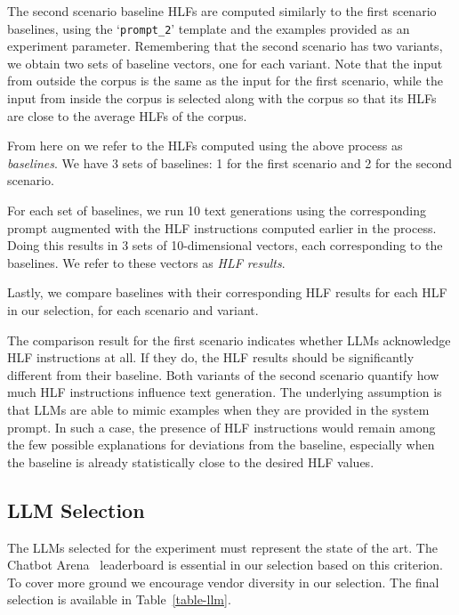 \documentclass[a4paper,twoside]{article}
\begin{document}
The second scenario baseline HLFs are computed similarly to the first scenario
baselines, using the `\texttt{prompt\_2}' template and the examples provided as
an experiment parameter.
Remembering that the second scenario has two variants, we obtain two sets of
baseline vectors, one for each variant.
Note that the input from outside the corpus is the same as the input for the
first scenario, while the input from inside the corpus is selected along with
the corpus so that its HLFs are close to the average HLFs of the corpus.

From here on we refer to the HLFs computed using the above process as
\textit{baselines}.
We have 3 sets of baselines: 1 for the first scenario and 2 for the second
scenario.

For each set of baselines, we run 10 text generations using the corresponding
prompt augmented with the HLF instructions computed earlier in the process.
Doing this results in 3 sets of 10-dimensional vectors, each corresponding to
the baselines.
We refer to these vectors as \textit{HLF results}.

Lastly, we compare baselines with their corresponding HLF results for each HLF
in our selection, for each scenario and variant.

The comparison result for the first scenario indicates whether LLMs acknowledge
HLF instructions at all.
If they do, the HLF results should be significantly different from their
baseline.
Both variants of the second scenario quantify how much HLF instructions
influence text generation.
The underlying assumption is that LLMs are able to mimic examples when they are
provided in the system prompt.
In such a case, the presence of HLF instructions would remain among the few
possible explanations for deviations from the baseline, especially when the
baseline is already statistically close to the desired HLF values.

\subsection{LLM Selection}\label{llm-selection}

The LLMs selected for the experiment must represent the state of the art.
The Chatbot Arena~\cite{chiang2024chatbot} leaderboard is essential in our
selection based on this criterion.
To cover more ground we encourage vendor diversity in our selection.
The final selection is available in Table~\ref{table-llm}.
\end{document}
